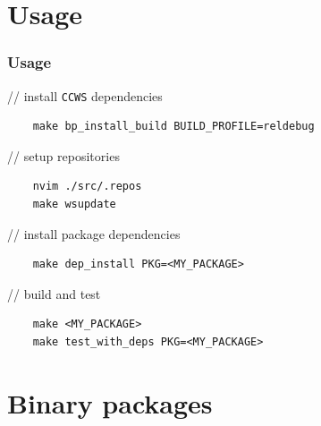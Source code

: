 \documentclass[hyperref={colorlinks=false, breaklinks=true},11pt]{beamer}
\begin{document}
\section{Usage}

\begin{frame}[fragile]
    \frametitle{Usage}
\begin{block}{}
// install \texttt{CCWS} dependencies
\begin{verbatim}
    make bp_install_build BUILD_PROFILE=reldebug
\end{verbatim}
\end{block}

\begin{block}{}
// setup repositories
\begin{verbatim}
    nvim ./src/.repos
    make wsupdate
\end{verbatim}
\end{block}

\begin{block}{}
// install package dependencies
\begin{verbatim}
    make dep_install PKG=<MY_PACKAGE>
\end{verbatim}
\end{block}

\begin{block}{}
// build and test
\begin{verbatim}
    make <MY_PACKAGE>
    make test_with_deps PKG=<MY_PACKAGE>
\end{verbatim}
\end{block}
\end{frame}


\section{Binary packages}
\end{document}
